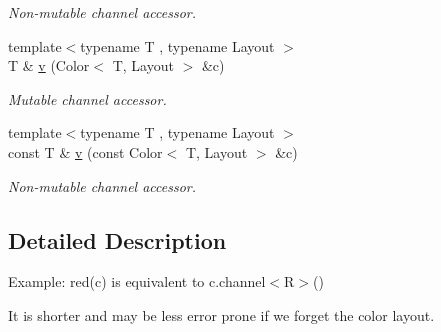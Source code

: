 \begin{DoxyCompactItemize}
\begin{DoxyCompactList}\small\item\em Non-\/mutable channel accessor. \end{DoxyCompactList}\item 
\hypertarget{group___channel_accessors_ga1dd2524c5b8d3db33137eedb803fc2ce}{{\footnotesize template$<$typename T , typename Layout $>$ }\\T \& \hyperlink{group___channel_accessors_ga1dd2524c5b8d3db33137eedb803fc2ce}{v} (Color$<$ T, Layout $>$ \&c)}\label{group___channel_accessors_ga1dd2524c5b8d3db33137eedb803fc2ce}

\begin{DoxyCompactList}\small\item\em Mutable channel accessor. \end{DoxyCompactList}\item 
\hypertarget{group___channel_accessors_ga11fac27b0966d58ad0e9abdbcf3d71b1}{{\footnotesize template$<$typename T , typename Layout $>$ }\\const T \& \hyperlink{group___channel_accessors_ga11fac27b0966d58ad0e9abdbcf3d71b1}{v} (const Color$<$ T, Layout $>$ \&c)}\label{group___channel_accessors_ga11fac27b0966d58ad0e9abdbcf3d71b1}

\begin{DoxyCompactList}\small\item\em Non-\/mutable channel accessor. \end{DoxyCompactList}\end{DoxyCompactItemize}


\subsection{Detailed Description}
Example\-: {\ttfamily red(c)} is equivalent to {\ttfamily c.\-channel$<$\-R$>$()}

It is shorter and may be less error prone if we forget the color layout. 

